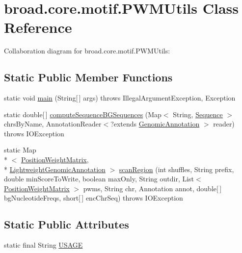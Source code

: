 \hypertarget{classbroad_1_1core_1_1motif_1_1_p_w_m_utils}{\section{broad.\+core.\+motif.\+P\+W\+M\+Utils Class Reference}
\label{classbroad_1_1core_1_1motif_1_1_p_w_m_utils}
}


Collaboration diagram for broad.\+core.\+motif.\+P\+W\+M\+Utils\+:
\subsection*{Static Public Member Functions}
\begin{DoxyCompactItemize}
\item 
static void \hyperlink{classbroad_1_1core_1_1motif_1_1_p_w_m_utils_a17646e545879c7d2061fbc4cad0bf834}{main} (String\mbox{[}$\,$\mbox{]} args)  throws Illegal\+Argument\+Exception, Exception 
\item 
static double\mbox{[}$\,$\mbox{]} \hyperlink{classbroad_1_1core_1_1motif_1_1_p_w_m_utils_ade2a53589ad91434fd0a187a7befd8b4}{compute\+Sequence\+B\+G\+Sequences} (Map$<$ String, \hyperlink{classbroad_1_1core_1_1sequence_1_1_sequence}{Sequence} $>$ chrs\+By\+Name, Annotation\+Reader$<$?extends \hyperlink{interfacebroad_1_1core_1_1annotation_1_1_genomic_annotation}{Genomic\+Annotation} $>$ reader)  throws I\+O\+Exception 
\item 
static Map\\*
$<$ \hyperlink{classbroad_1_1core_1_1motif_1_1_position_weight_matrix}{Position\+Weight\+Matrix}, \\*
\hyperlink{interfacebroad_1_1core_1_1annotation_1_1_lightweight_genomic_annotation}{Lightweight\+Genomic\+Annotation} $>$ \hyperlink{classbroad_1_1core_1_1motif_1_1_p_w_m_utils_a901bd6475f321d8416ddbf47d03d32b4}{scan\+Region} (int shuffles, String prefix, double min\+Score\+To\+Write, boolean max\+Only, String outdir, List$<$ \hyperlink{classbroad_1_1core_1_1motif_1_1_position_weight_matrix}{Position\+Weight\+Matrix} $>$ pwms, String chr, Annotation annot, double\mbox{[}$\,$\mbox{]} bg\+Nucleotide\+Freqs, short\mbox{[}$\,$\mbox{]} enc\+Chr\+Seq)  throws I\+O\+Exception 
\end{DoxyCompactItemize}
\subsection*{Static Public Attributes}
\begin{DoxyCompactItemize}
\item 
static final String \hyperlink{classbroad_1_1core_1_1motif_1_1_p_w_m_utils_aff73c275f71b26881df0ee1d11924665}{U\+S\+A\+G\+E}
\end{DoxyCompactItemize}


